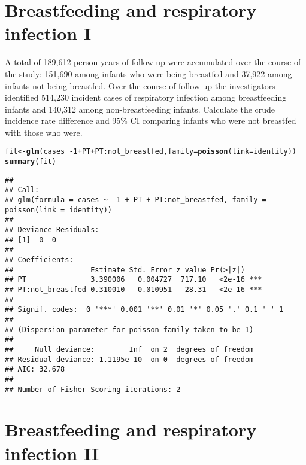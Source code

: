 \documentclass[landscape,twocolumn,letterpaper,9pt,reqno]{article}\usepackage[]{graphicx}\usepackage[]{color}
\newcommand{\hlnum}[1]{\textcolor[rgb]{0.686,0.059,0.569}{#1}}%
\newcommand{\hlopt}[1]{\textcolor[rgb]{0,0,0}{#1}}%
\newcommand{\hlstd}[1]{\textcolor[rgb]{0.345,0.345,0.345}{#1}}%
\newcommand{\hlkwb}[1]{\textcolor[rgb]{0.69,0.353,0.396}{#1}}%
\newcommand{\hlkwc}[1]{\textcolor[rgb]{0.333,0.667,0.333}{#1}}%
\newcommand{\hlkwd}[1]{\textcolor[rgb]{0.737,0.353,0.396}{\textbf{#1}}}%
\newenvironment{knitrout}{}{} %
\begin{document}
\section{Breastfeeding and respiratory infection I}

A total of 189,612 person-years of follow up were accumulated over the course of the study: 151,690
among infants who were being breastfed and 37,922 among infants not being breastfed. Over the
course of follow up the investigators identified 514,230 incident cases of respiratory infection among
breastfeeding infants and 140,312 among non-breastfeeding infants. Calculate the crude incidence rate difference and 95\% CI comparing infants who were not breastfed with those who were.

\begin{knitrout}\small
{}\color{fgcolor}
\begin{alltt}
\hlstd{fit} \hlkwb{<-} \hlkwd{glm}\hlstd{(cases} \hlopt{~ -}\hlnum{1} \hlopt{+} \hlstd{PT} \hlopt{+} \hlstd{PT}\hlopt{:}\hlstd{not_breastfed,} \hlkwc{family} \hlstd{=} \hlkwd{poisson}\hlstd{(}\hlkwc{link} \hlstd{= identity))}
\hlkwd{summary}\hlstd{(fit)}
\end{alltt}
\begin{verbatim}
## 
## Call:
## glm(formula = cases ~ -1 + PT + PT:not_breastfed, family = poisson(link = identity))
## 
## Deviance Residuals: 
## [1]  0  0
## 
## Coefficients:
##                  Estimate Std. Error z value Pr(>|z|)    
## PT               3.390006   0.004727  717.10   <2e-16 ***
## PT:not_breastfed 0.310010   0.010951   28.31   <2e-16 ***
## ---
## Signif. codes:  0 '***' 0.001 '**' 0.01 '*' 0.05 '.' 0.1 ' ' 1
## 
## (Dispersion parameter for poisson family taken to be 1)
## 
##     Null deviance:        Inf  on 2  degrees of freedom
## Residual deviance: 1.1195e-10  on 0  degrees of freedom
## AIC: 32.678
## 
## Number of Fisher Scoring iterations: 2
\end{verbatim}

\end{knitrout}



	

\clearpage




\section{Breastfeeding and respiratory infection II}
\end{document}
